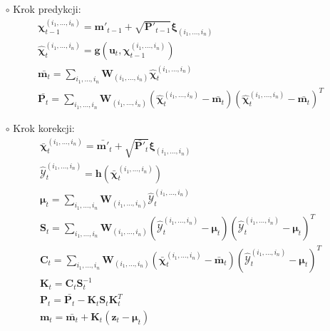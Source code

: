 \begin{itemize}
	\item[$\circ$] Krok predykcji:\\
	\begin{align}\label{eq:GHKFNonAdditivePrediction}
	&\boldsymbol{\chi}^{(i_1, \dots, i_n)}_{t-1}=\boldsymbol{m}'_{t-1}+\sqrt{\boldsymbol{P}'_{t-1}}\boldsymbol{\xi}_{(i_1, \dots, i_n)} \nonumber \\
	&\hat{\boldsymbol{\chi}}^{(i_1, \dots, i_n)}_{t}=\boldsymbol{g}(\boldsymbol{u}_t,\boldsymbol{\chi}^{(i_1, \dots, i_n)}_{t-1}) \nonumber \\
	&\bar{\boldsymbol{m}_t}=\sum_{i_1,\dots,i_n} \boldsymbol{W}_{(i_1, \dots, i_n)} \hat{\boldsymbol{\chi}}^{(i_1, \dots, i_n)}_{t} \nonumber \\
	&\bar{\boldsymbol{P}_t}=\sum_{i_1,\dots,i_n} \boldsymbol{W}_{(i_1, \dots, i_n)}(\hat{\boldsymbol{\chi}}^{(i_1, \dots, i_n)}_{t} - \bar{\boldsymbol{m}_t})(\hat{\boldsymbol{\chi}}^{(i_1, \dots, i_n)}_{t} - \bar{\boldsymbol{m}_t})^T
	\end{align}
	\item[$\circ$] Krok korekcji:\\
		\begin{align} \label{eq:GHKFNonAdditiveCorrection}
	&\bar{\boldsymbol{\chi}}^{(i_1, \dots, i_n)}_{t} = \bar{\boldsymbol{m}'}_{t} + \sqrt{\bar{\boldsymbol{P}'}_{t}} \boldsymbol{\xi}_{(i_1, \dots, i_n)} \nonumber \\
	&\hat{\boldsymbol{\mathcal{Y}}}^{(i_1, \dots, i_n)}_{t} = \boldsymbol{h}(\bar{\boldsymbol{\chi}}^{(i_1, \dots, i_n)}_{t}) \nonumber \\
	&\boldsymbol{\mu}_t=\sum_{i_1,\dots,i_n} \boldsymbol{W}_{(i_1, \dots, i_n)} \hat{\boldsymbol{\mathcal{Y}}}^{(i_1, \dots, i_n)}_{t} \nonumber \\
	&\boldsymbol{S}_t=\sum_{i_1,\dots,i_n} \boldsymbol{W}_{(i_1, \dots, i_n)}(\hat{\boldsymbol{\mathcal{Y}}}^{(i_1, \dots, i_n)}_{t} - \boldsymbol{\mu}_t)(\hat{\boldsymbol{\mathcal{Y}}}^{(i_1, \dots, i_n)}_{t} - \boldsymbol{\mu}_t)^T \nonumber \\
	&\boldsymbol{C}_t = \sum_{i_1,\dots,i_n} \boldsymbol{W}_{(i_1, \dots, i_n)} (\bar{\boldsymbol{\chi}}^{(i_1, \dots, i_n)}_{t} - \bar{\boldsymbol{m}}_t)(\hat{\boldsymbol{\mathcal{Y}}}^{(i_1, \dots, i_n)}_{t} - \boldsymbol{\mu}_t)^T \nonumber \\
	&\boldsymbol{K}_t=\boldsymbol{C}_t\boldsymbol{S}_t^{-1} \nonumber \\
	&\boldsymbol{P}_t=\bar{\mathbf{P}_{t}} - \boldsymbol{K}_t\boldsymbol{S}_t\boldsymbol{K}_t^T \nonumber \\
	&\boldsymbol{m}_t = \bar{\boldsymbol{m}_t} + \boldsymbol{K}_t(\boldsymbol{z}_t - \boldsymbol{\mu}_t)
	\end{align}
\end{itemize}